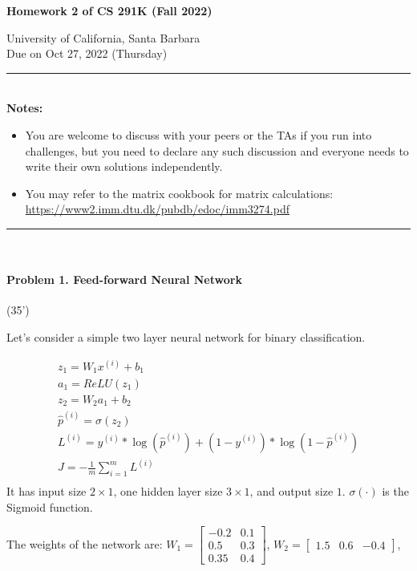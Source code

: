 \documentclass[11pt]{article}\pagestyle{plain}
\begin{document}
\begin{center}\textbf{{\LARGE Homework 2 of CS 291K (Fall 2022)}\\[.3in]}

{\large University of California, Santa Barbara}\\[.3in]
{\large Due on Oct 27, 2022 (Thursday)}\\[.1in]
\end{center}
\rule[-10pt]{16.5cm}{0.05em} \\ 
\newline
\textbf{Notes:}
\vspace{-1em}
\begin{itemize}
\item You are welcome to discuss with your peers or the TAs if you run into challenges, but you need to declare any such discussion and everyone needs to write their own solutions independently.
\item You may refer to the matrix cookbook for matrix calculations: \url{https://www2.imm.dtu.dk/pubdb/edoc/imm3274.pdf}
\end{itemize}
\vspace{-2em}
\rule[-10pt]{16.5cm}{0.05em} \\


\paragraph{Problem 1. Feed-forward Neural Network}  (35') 


Let's consider a simple two layer neural network for binary classification. 

\begin{gather*}
	z_1 = W_1x^{(i)} + b_1\\
	a_1 = ReLU(z_1)\\
	z_2 = W_2 a_1 + b_2\\
	\hat{p}^{(i)} = \sigma(z_2)\\
	L^{(i)} = y^{(i)}*\log(\hat{p}^{(i)}) + (1- y^{(i)})*\log(1 - \hat{p}^{(i)})\\
	J = -\frac{1}{m} \displaystyle \sum_{i=1}^{m}L^{(i)}\\
\end{gather*}
It has input size $2\times 1$, one hidden layer size $3\times 1$, and output size $1$. $\sigma(\cdot)$ is the Sigmoid function.


The weights of the network are: 
$
W_1=
\begin{bmatrix}
	-0.2 & 0.1\\
	0.5 & 0.3\\
	0.35 & 0.4
\end{bmatrix}
$,
$
W_2=
\begin{bmatrix}
	1.5 & 0.6 & -0.4
\end{bmatrix}
$,
\end{document}
